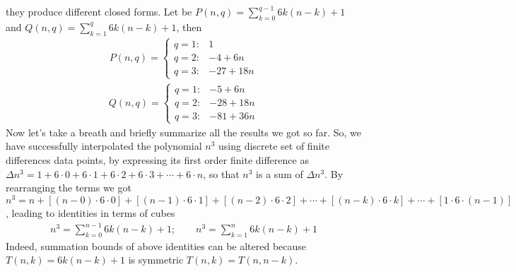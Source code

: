 they produce different closed forms.
Let be $P(n, q) = \sum_{k=0}^{q-1} 6k(n-k) + 1$ and $Q(n, q) = \sum_{k=1}^{q} 6k(n-k) + 1$, then
\begin{align*}
    P(n, q) =
    \begin{cases}
        q = 1: & 1 \\
        q = 2: & -4 + 6 n \\
        q = 3: & -27 + 18 n
    \end{cases}
\end{align*}
\begin{align*}
    Q(n, q) =
    \begin{cases}
        q = 1: & -5 + 6 n \\
        q = 2: & -28 + 18 n \\
        q = 3: & -81 + 36 n
    \end{cases}
\end{align*}
Now let's take a breath and briefly summarize all the results we got so far.
So, we have successfully interpolated the polynomial $n^3$ using discrete set of finite differences data points,
by expressing its first order finite difference as $\Delta n^3 = 1+6\cdot0+6\cdot1+6\cdot2+6\cdot3+\cdots+6\cdot n$,
so that $n^3$ is a sum of $\Delta n^3$.
By rearranging the terms we got $n^3 = n + [(n-0) \cdot 6 \cdot 0] + [(n-1)\cdot6\cdot1] + [(n-2)\cdot6\cdot2]
+ \cdots + [(n-k)\cdot 6 \cdot k] + \cdots + [1\cdot6\cdot(n-1)]$, leading to identities in terms of cubes
\begin{align*}
    n^3 = \sum_{k=0}^{n-1} 6k(n-k) + 1; \quad \quad n^3 = \sum_{k=1}^{n} 6k(n-k) + 1
\end{align*}
Indeed, summation bounds of above identities can be altered because $T(n,k) = 6k(n-k) + 1$
is symmetric $T(n,k) = T(n,n-k)$.
